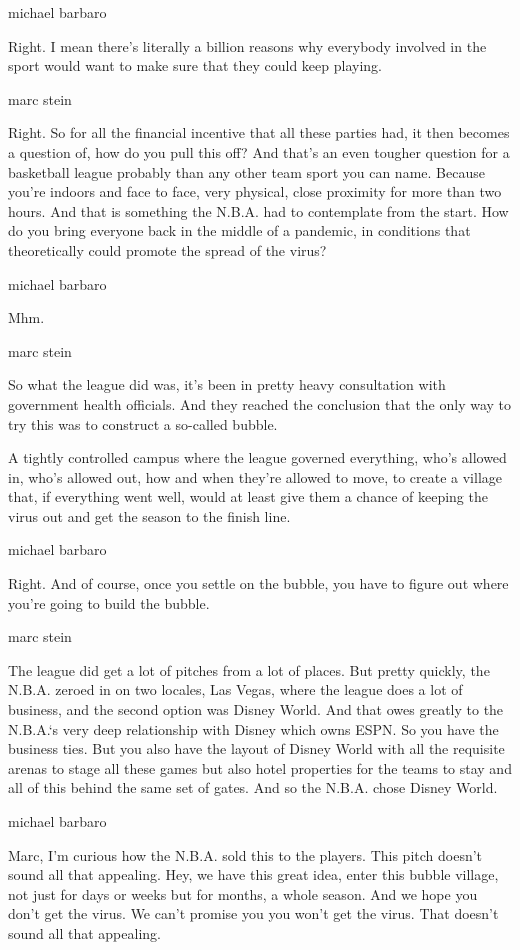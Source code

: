 michael barbaro

Right. I mean there's literally a billion reasons why everybody involved
in the sport would want to make sure that they could keep playing.

marc stein

Right. So for all the financial incentive that all these parties had, it
then becomes a question of, how do you pull this off? And that's an even
tougher question for a basketball league probably than any other team
sport you can name. Because you're indoors and face to face, very
physical, close proximity for more than two hours. And that is something
the N.B.A. had to contemplate from the start. How do you bring everyone
back in the middle of a pandemic, in conditions that theoretically could
promote the spread of the virus?

michael barbaro

Mhm.

marc stein

So what the league did was, it's been in pretty heavy consultation with
government health officials. And they reached the conclusion that the
only way to try this was to construct a so-called bubble.

A tightly controlled campus where the league governed everything, who's
allowed in, who's allowed out, how and when they're allowed to move, to
create a village that, if everything went well, would at least give them
a chance of keeping the virus out and get the season to the finish line.

michael barbaro

Right. And of course, once you settle on the bubble, you have to figure
out where you're going to build the bubble.

marc stein

The league did get a lot of pitches from a lot of places. But pretty
quickly, the N.B.A. zeroed in on two locales, Las Vegas, where the
league does a lot of business, and the second option was Disney World.
And that owes greatly to the N.B.A.`s very deep relationship with Disney
which owns ESPN. So you have the business ties. But you also have the
layout of Disney World with all the requisite arenas to stage all these
games but also hotel properties for the teams to stay and all of this
behind the same set of gates. And so the N.B.A. chose Disney World.

michael barbaro

Marc, I'm curious how the N.B.A. sold this to the players. This pitch
doesn't sound all that appealing. Hey, we have this great idea, enter
this bubble village, not just for days or weeks but for months, a whole
season. And we hope you don't get the virus. We can't promise you you
won't get the virus. That doesn't sound all that appealing.

